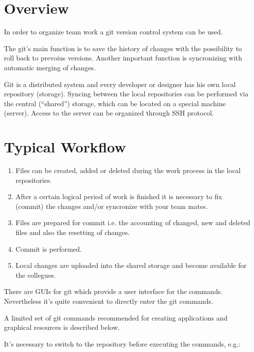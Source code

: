 \documentclass[a4paper,12pt,oneside]{sphinxmanual}
\begin{document}
\section{Overview}
\label{git_short_manual:what-is-git}\label{git_short_manual:id1}
In order to organize team work a git version control system can be used.

The git's main function is to save the history of changes with the possibility to roll back to prevoius versions. Another important function is syncronizing with automatic merging of changes.

Git is a distributed system and every developer or designer has his own local repository (storage). Syncing between the local repositories can be performed via the central (``shared'') storage, which can be located on a special machine (server). Access to the server can be organized through SSH protocol.


\section{Typical Workflow}
\label{git_short_manual:id2}\label{git_short_manual:git-pipeline}\begin{enumerate}
\item {} 
Files can be created, added or deleted during the work process in the local repositories.

\item {} 
After a certain logical period of work is finished it is necessary to fix (commit) the changes and/or syncronize with your team mates.

\item {} 
Files are prepared for commit i.e. the accounting of changed, new and deleted files and also the resetting of changes.

\item {} 
Commit is performed.

\item {} 
Local changes are uploaded into the shared storage and become available for the collegues.

\end{enumerate}

There are GUIs for git which provide a user interface for the commands. Nevertheless it's quite convenient to directly enter the git commands.

A limited set of git commands recommended for creating applications and graphical resources is described below.

It's necessary to switch to the repository before executing the commands, e.g.:
\end{document}
